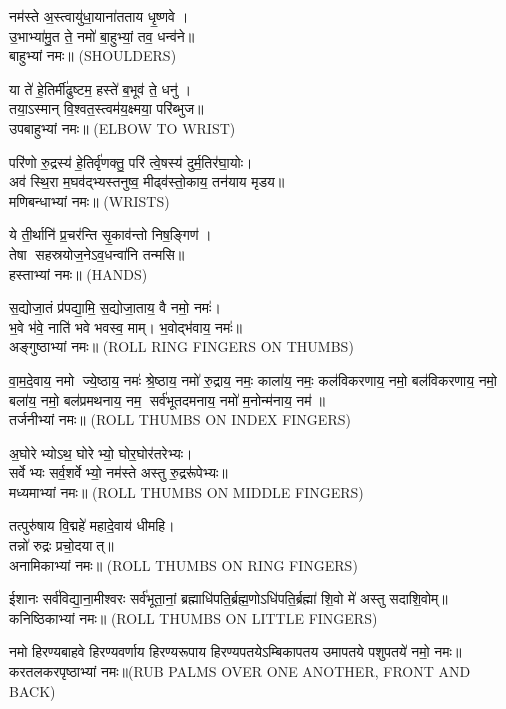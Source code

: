 नम॑स्ते अ॒स्त्वायु॑धा॒याना॑तताय धृ॒ष्णवे।\\
 उ॒भाभ्या॑मु॒त ते॒ नमो॑ बा॒हुभ्यां॒ तव॒ धन्व॑ने॥\\
बाहुभ्यां नमः॥ {\scriptsize (SHOULDERS)}


 या ते॑ हे॒तिर्मी॑ढुष्टम॒ हस्ते॑ ब॒भूव॑ ते॒ धनु॑।\\
 तया॒ऽस्मान् वि॒श्वत॒स्त्वम॑य॒क्ष्मया॒ परि॑ब्भुज॥\\
उपबाहुभ्यां नमः॥ {\scriptsize (ELBOW TO WRIST)}

परि॑णो रु॒द्रस्य॑ हे॒तिर्वृ॑णक्तु॒ परि॑ त्वे॒षस्य॑ दुर्म॒तिर॑घा॒योः।\\
 अव॑ स्थि॒रा म॒घव॑द्भ्यस्तनुष्व॒ मीढ्व॑स्तो॒काय॒ तन॑याय मृडय॥\\
मणिबन्धाभ्यां नमः॥ {\scriptsize (WRISTS)}

 ये ती॒र्थानि॑ प्र॒चर॑न्ति सृ॒काव॑न्तो निष॒ङ्गिण॑।\\
 तेषा सहस्रयोज॒नेऽव॒धन्वा॑नि तन्मसि॥\\
हस्ताभ्यां नमः॥ {\scriptsize (HANDS)}


स॒द्योजा॒तं प्र॑पद्या॒मि॒ स॒द्योजा॒ताय॒ वै नमो॒ नमः॑।\\
भ॒वे भ॑वे॒ नाति॑ भवे भवस्व॒ माम्। भ॒वोद्भ॑वाय॒ नमः॑॥ \\
अङ्गुष्ठाभ्यां नमः॥ {\scriptsize (ROLL RING FINGERS ON THUMBS)}

वा॒म॒दे॒वाय॒ नमो ज्ये॒ष्ठाय॒ नमः॑ श्रे॒ष्ठाय॒ नमो॑ रु॒द्राय॒ नमः॒ काला॑य॒ नमः॒ कल॑विकरणाय॒ नमो॒ बल॑विकरणाय॒ नमो॒ बला॑य॒ नमो॒ बल॑प्रमथनाय॒ नम॒ सर्व॑भूतदमनाय॒ नमो॑ म॒नोन्म॑नाय॒ नम॑॥\\
तर्जनीभ्यां नमः॥ {\scriptsize (ROLL THUMBS ON INDEX FINGERS)}

अ॒घोरेभ्योऽथ॒ घोरेभ्यो॒ घोर॒घोर॑तरेभ्यः।\\
सर्वेभ्यः सर्व॒शर्वेभ्यो॒ नम॑स्ते अस्तु रु॒द्ररू॑पेभ्यः॥\\
मध्यमाभ्यां नमः॥ {\scriptsize (ROLL THUMBS ON MIDDLE FINGERS)}

तत्पुरु॑षाय वि॒द्महे॑ महादे॒वाय॑ धीमहि।\\
तन्नो॑ रुद्रः प्रचो॒दयात्॥\\
अनामिकाभ्यां नमः॥ {\scriptsize (ROLL THUMBS ON RING FINGERS)}

ईशानः सर्व॑विद्या॒ना॒मीश्वरः सर्व॑भूता॒नां॒ ब्रह्माधि॑पति॒र्ब्रह्म॒णो\-ऽधि॑पति॒र्ब्रह्मा॑ शि॒वो मे॑ अस्तु सदाशि॒वोम्॥\\
कनिष्ठिकाभ्यां नमः॥ {\scriptsize (ROLL THUMBS ON LITTLE FINGERS)}

नमो हिरण्यबाहवे हिरण्यवर्णाय हिरण्यरूपाय हिरण्यपतये\-ऽम्बिकापतय उमापतये पशुपतये॑ नमो॒ नमः॥\\
करतलकरपृष्ठाभ्यां नमः॥{\scriptsize (RUB PALMS OVER ONE ANOTHER, FRONT AND BACK)}

